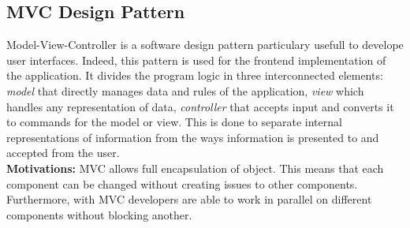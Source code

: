 \documentclass{report}
\begin{document}
\subsection{MVC Design Pattern}
Model-View-Controller is a software design pattern particulary usefull to develope user interfaces. Indeed, this pattern is used for the frontend implementation of the application. 
It divides the program logic in three interconnected elements: \textit{model} that directly manages data and rules of the application, \textit{view} which handles any representation of data, \textit{controller} that 
accepts input and converts it to commands for the model or view. This is done to separate internal representations of information 
from the ways information is presented to and accepted from the user. \\
\textbf{Motivations:} MVC allows full encapsulation of object. This means that each component can be changed without creating issues to other components.
Furthermore, with MVC developers are able to work in parallel on different components without blocking another.
\end{document}
